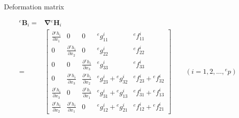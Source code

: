 \documentclass[aspectratio=169]{beamer}
\begin{document}
{\begin{frame}{Deformation matrix}
  \begin{block}{}\vspace{-0.5cm}
    \begin{align*}
      {}^e\mathbf B_i = & \boldsymbol\nabla {}^e\mathbf H_i \\
      =                 & \left[
        \begin{array}{ccccc}
          \frac{\partial {}^eh_i}{\partial x_1} & 0                                     & 0                                     & {}^eg_{11}^i                & {}^ef_{11}^i                \\[10pt]
          0                                     & \frac{\partial{}^e h_i}{\partial x_2} & 0                                     & {}^eg_{22}^i                & {}^ef_{22}^i                \\[10pt]
          0                                     & 0                                     & \frac{\partial {}^eh_i}{\partial x_3} & {}^eg_{33}^i                & {}^ef_{33}^i                \\[10pt]
          0                                     & \frac{\partial {}^eh_i}{\partial x_3} & \frac{\partial {}^eh_i}{\partial x_2} & {}^eg_{23}^i + {}^eg_{32}^i & {}^ef_{23}^i + {}^ef_{32}^i \\[10pt]
          \frac{\partial {}^eh_i}{\partial x_3} & 0                                     & \frac{\partial {}^eh_i}{\partial x_1} & {}^eg_{31}^i + {}^eg_{13}^i & {}^ef_{31}^i + {}^ef_{13}^i \\[10pt]
          \frac{\partial{}^e h_i}{\partial x_2} & \frac{\partial{}^e h_i}{\partial x_1} & 0                                     & {}^eg_{12}^i + {}^eg_{21}^i & {}^ef_{12}^i + {}^ef_{21}^i
        \end{array}
        \right]
      \qquad (i = 1, 2, \dots, {}^ep)
    \end{align*}
  \end{block}
\end{frame}
}
\end{document}
